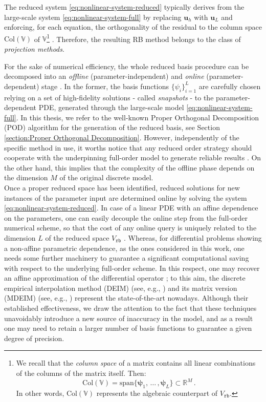 \documentclass[12pt, a4paper, twoside, openright]{report}
\numberwithin{equation}{chapter}
\theoremstyle{theorem}
\theoremstyle{definition}
\theoremstyle{remark}
\theoremstyle{proposition}
\numberwithin{figure}{chapter}
\begin{document}
		The reduced system \eqref{eq:nonlinear-system-reduced} typically derives from the large-scale system \eqref{eq:nonlinear-system-full} by replacing $\mathbf{u}_h$ with $\mathbf{u}_L$ and enforcing, for each equation, the orthogonality of the residual to the column space $\text{Col}(\mathbb{V})$ of $\mathbb{V}$\footnote{We recall that the \emph{column space} of a matrix contains all linear combinations of the columns of the matrix itself. Then: \begin{equation*} \text{Col}(\mathbb{V}) = \text{span} \big\lbrace \boldsymbol{\psi}_1, \, \ldots \, , \boldsymbol{\psi}_L \big\rbrace \subset \mathbb{R}^M \, . \end{equation*} In other words, $\text{Col}(\mathbb{V})$ represents the algebraic counterpart of $V_{\texttt{rb}}$.} \cite{MN16}. Therefore, the resulting RB method belongs to the class of \emph{projection methods}. 
		
		For the sake of numerical efficiency, the whole reduced basis procedure can be decomposed into an \emph{offline} (parameter-independent) and \emph{online} (parameter-dependent) stage \cite{Pru02}. In the former, the basis functions $\big\lbrace \psi_i \big\rbrace_{i = 1}^L$ are carefully chosen relying on a set of high-fidelity solutions - called \emph{snapshots} - to the parameter-dependent PDE, generated through the large-scale model \eqref{eq:nonlinear-system-full}. In this thesis, we refer to the well-known Proper Orthogonal Decomposition (POD) algorithm for the generation of the reduced basis, see Section \ref{section:Proper Orthogonal Decomposition}. However, independently of the specific method in use, it worths notice that any reduced order strategy should cooperate with the underpinning full-order model to generate reliable results \cite{HSR16}. On the other hand, this implies that the complexity of the offline phase depends on the dimension $M$ of the original discrete model. \\
		Once a proper reduced space has been identified, reduced solutions for new instances of the parameter input are determined online by solving the system \eqref{eq:nonlinear-system-reduced}. In case of a linear PDE with an affine dependence on the parameters, one can easily decouple the online step from the full-order numerical scheme, so that the cost of any online query is uniquely related to the dimension $L$ of the reduced space $V_{\texttt{rb}}$ \cite{QMN15}. Whereas, for differential problems showing a non-affine parametric dependence, as the ones considered in this work, one needs some further machinery to guarantee a significant computational saving with respect to the underlying full-order scheme. In this respect, one may recover an affine approximation of the differential operator \cite{MN16}; to this aim, the discrete empirical interpolation method (DEIM) (see, e.g., \cite{Bar04}) and its matrix version (MDEIM) (see, e.g., \cite{NMA15}) represent the state-of-the-art nowadays. Although their established effectiveness, we draw the attention to the fact that these techniques unavoidably introduce a new source of inaccuracy in the model, and as a result one may need to retain a larger number of basis functions to guarantee a given degree of precision.
		
\end{document}
